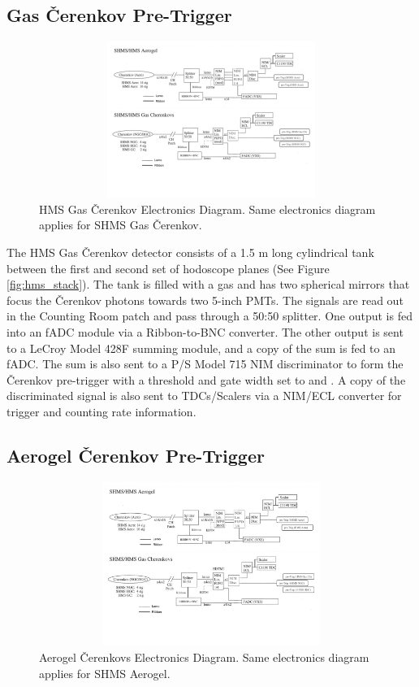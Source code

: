 \documentclass[11pt]{article}
\begin{document}
\subsection{Gas \v{C}erenkov Pre-Trigger} \label{hms_cer_section}

\begin{figure}[h!]
  \centering
  \includegraphics[width=7.0in, height=2.0in]{HMS_Cer_trig.pdf}
  \caption{HMS Gas \v{C}erenkov Electronics Diagram. Same electronics diagram applies for SHMS Gas \v{C}erenkov.}
  \label{fig:hms_gas_cer_trg}
\end{figure}

\indent The HMS Gas \v{C}erenkov detector consists of a 1.5 m long cylindrical tank between the first and second set of hodoscope planes (See Figure \ref{fig:hms_stack}).
The tank is filled with a gas and has two spherical mirrors that focus the \v{C}erenkov photons towards two 5-inch PMTs\cite{hms_cer_article}. The
signals are read out in the Counting Room patch and pass through a 50:50 splitter. One output is fed into
an fADC module via a Ribbon-to-BNC converter. The other output is sent to a LeCroy Model 428F summing module, and a copy of the sum is fed to an fADC. The sum is
also sent to a P/S Model 715 NIM discriminator to form the \v{C}erenkov pre-trigger with a threshold and gate width set to \hcerthrs and \hcergate. A copy of the discriminated signal is also sent to TDCs/Scalers via a NIM/ECL converter for trigger and counting rate information.


\subsection{Aerogel \v{C}erenkov Pre-Trigger}

\begin{figure}[h!]
  \centering
  \includegraphics[width=6.5in, height=2.1in]{HMS_Aero_trig.pdf}
  \caption{Aerogel \v{C}erenkovs Electronics Diagram. Same electronics diagram applies for SHMS Aerogel.}
  \label{fig:hms_aero_trg}
\end{figure}
\end{document}
